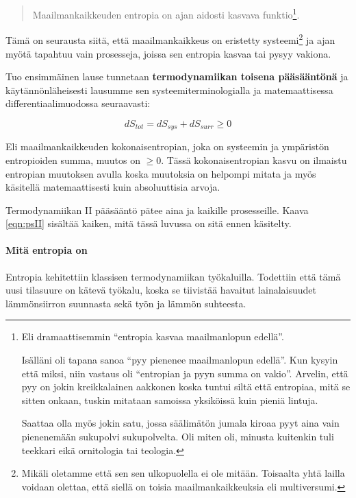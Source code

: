 \documentclass[12pt,a4paper,finnish]{book}
\begin{document}
\begin{quote}
 Maailmankaikkeuden entropia on ajan aidosti kasvava funktio\footnote{Eli dramaattisemmin ``entropia 
 kasvaa maailmanlopun edellä''. 
 
 Isälläni oli tapana sanoa ``pyy pienenee maailmanlopun 
 edellä''. Kun kysyin että miksi, niin vastaus oli ``entropian ja pyyn summa on vakio''. Arvelin, että 
 pyy on jokin kreikkalainen aakkonen koska tuntui siltä että entropiaa, mitä se sitten onkaan, tuskin 
 mitataan samoissa yksiköissä kuin pieniä lintuja. 
 
 Saattaa olla myös jokin satu, jossa säälimätön jumala kiroaa pyyt aina vain pienenemään sukupolvi 
 sukupolvelta. Oli miten oli, minusta kuitenkin tuli teekkari eikä ornitologia tai teologia.}.
\end{quote}

Tämä on seurausta siitä, että maailmankaikkeus on eristetty systeemi\footnote{Mikäli oletamme että sen 
sen ulkopuolella ei ole mitään. Toisaalta yhtä lailla voidaan olettaa, että siellä on toisia maailmankaikkeuksia 
eli multiversumi.} ja ajan myötä tapahtuu vain prosesseja, joissa sen entropia kasvaa tai pysyy vakiona.

Tuo ensimmäinen lause tunnetaan \textbf{termodynamiikan toisena pääsääntönä} ja käytännönläheisesti 
lausumme sen systeemiterminologialla ja matemaattisessa differentiaalimuodossa seuraavasti:

\begin{equation}
\label{eqn:psII}
 dS_{tot} = dS_{sys} + dS_{surr} \geq 0
\end{equation}

Eli maailmankaikkeuden kokonaisentropian, joka on systeemin ja ympäristön entropioiden summa, muutos on $\geq 0$. 
Tässä kokonaisentropian kasvu on ilmaistu entropian muutoksen avulla koska muutoksia on helpompi mitata 
ja myös käsitellä matemaattisesti kuin absoluuttisia arvoja.

Termodynamiikan II pääsääntö pätee aina ja kaikille prosesseille. Kaava \ref{eqn:psII} sisältää kaiken, 
mitä tässä luvussa on sitä ennen käsitelty.


\paragraph{Mitä entropia on}

Entropia kehitettiin klassisen termodynamiikan työkaluilla. Todettiin että tämä uusi tilasuure on kätevä 
työkalu, koska se tiivistää havaitut lainalaisuudet lämmönsiirron suunnasta sekä työn ja lämmön suhteesta.
\end{document}
